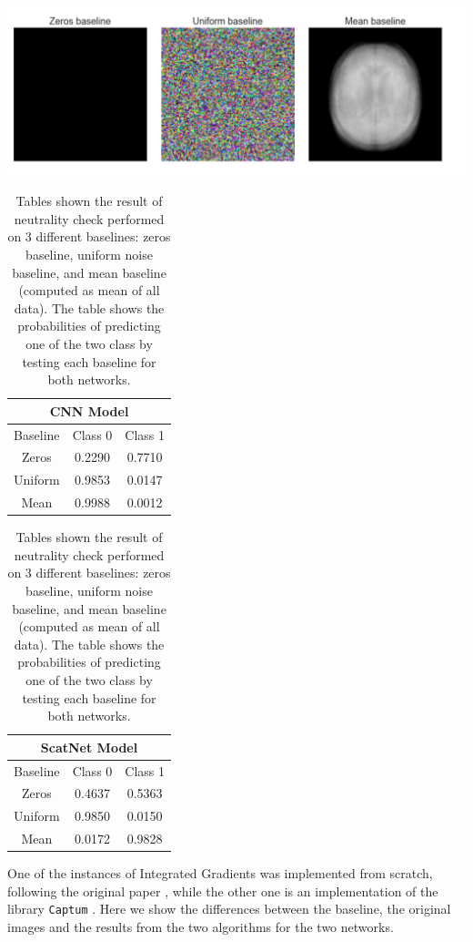 \documentclass[11pt]{article}
\newenvironment{Figure}
  {\par\medskip\noindent\minipage{\linewidth}}
  {\endminipage\par\medskip}
\begin{document}
\begin{multicols*}{2}
\begin{Figure}
    \includegraphics[width=\linewidth]{images/baseline.png}
    \label{fig:baseline}
\end{Figure}

\begin{table}[H]
    \centering
    \begin{tabular}{|c|c|c|}
        \multicolumn{3}{c}{CNN Model} \\
        \hline
        Baseline & Class 0 & Class 1 \\
        \hline
        Zeros & 0.2290 & 0.7710 \\ 
        Uniform & 0.9853 & 0.0147 \\
        Mean & 0.9988 & 0.0012 \\
        \hline
    \end{tabular}
    \label{tab:neutrality1}
    \vspace{0.2cm}
    \begin{tabular}{|c|c|c|}
        \multicolumn{3}{c}{ScatNet Model} \\
        \hline
        Baseline & Class 0 & Class 1 \\
        \hline
        Zeros & 0.4637 & 0.5363 \\ 
        Uniform & 0.9850 & 0.0150 \\
        Mean & 0.0172 & 0.9828 \\
        \hline
    \end{tabular}
    \label{tab:neutrality2}
    \caption{Tables shown the result of neutrality check performed on 3 different baselines: zeros baseline, uniform noise baseline, and mean baseline (computed as mean of all data). The table shows the probabilities of predicting one of the two class by testing each baseline for both networks.}
\end{table}

One of the instances of Integrated Gradients was implemented from scratch, following the original paper \cite{sundararajan2017axiomatic}, while the other one is an implementation of the library \texttt{Captum} \cite{captum}. Here we show the differences between the baseline, the original images and the results from the two algorithms for the two networks. 


\end{multicols*}
\end{document}
